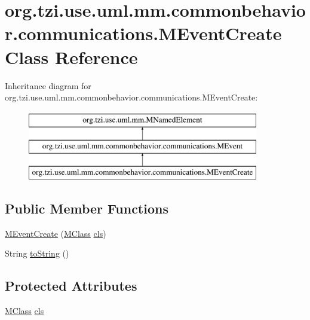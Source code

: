 \hypertarget{classorg_1_1tzi_1_1use_1_1uml_1_1mm_1_1commonbehavior_1_1communications_1_1_m_event_create}{\section{org.\-tzi.\-use.\-uml.\-mm.\-commonbehavior.\-communications.\-M\-Event\-Create Class Reference}
\label{classorg_1_1tzi_1_1use_1_1uml_1_1mm_1_1commonbehavior_1_1communications_1_1_m_event_create}
}
Inheritance diagram for org.\-tzi.\-use.\-uml.\-mm.\-commonbehavior.\-communications.\-M\-Event\-Create\-:\begin{figure}[H]
\begin{center}
\leavevmode
\includegraphics[height=3.000000cm]{classorg_1_1tzi_1_1use_1_1uml_1_1mm_1_1commonbehavior_1_1communications_1_1_m_event_create}
\end{center}
\end{figure}
\subsection*{Public Member Functions}
\begin{DoxyCompactItemize}
\item 
\hyperlink{classorg_1_1tzi_1_1use_1_1uml_1_1mm_1_1commonbehavior_1_1communications_1_1_m_event_create_aac5f00930112c39aebfd8ddcf6741789}{M\-Event\-Create} (\hyperlink{interfaceorg_1_1tzi_1_1use_1_1uml_1_1mm_1_1_m_class}{M\-Class} \hyperlink{classorg_1_1tzi_1_1use_1_1uml_1_1mm_1_1commonbehavior_1_1communications_1_1_m_event_create_a9f41a682f03420e0bee0f8ef20026754}{cls})
\item 
String \hyperlink{classorg_1_1tzi_1_1use_1_1uml_1_1mm_1_1commonbehavior_1_1communications_1_1_m_event_create_a51575ac36851d168f94006c5722f77ed}{to\-String} ()
\end{DoxyCompactItemize}
\subsection*{Protected Attributes}
\begin{DoxyCompactItemize}
\item 
\hyperlink{interfaceorg_1_1tzi_1_1use_1_1uml_1_1mm_1_1_m_class}{M\-Class} \hyperlink{classorg_1_1tzi_1_1use_1_1uml_1_1mm_1_1commonbehavior_1_1communications_1_1_m_event_create_a9f41a682f03420e0bee0f8ef20026754}{cls}
\end{DoxyCompactItemize}


